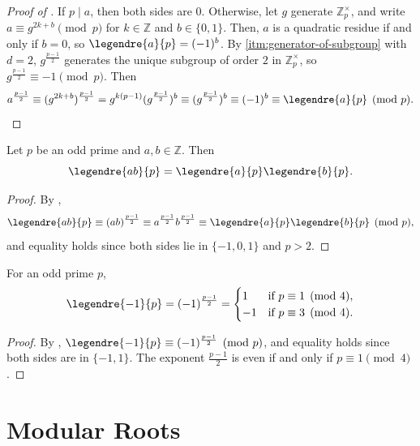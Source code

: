 \begin{proof}[Proof of ]
    If \(p \mid a\), then both sides are \(0\).
    Otherwise, let \(g\) generate \(\mathbb{Z}_p^\times\), and write \(a \equiv g^{2k + b} \pmod{p}\) for \(k \in \mathbb{Z}\) and \(b \in \{0, 1\}\).
    Then, \(a\) is a quadratic residue if and only if \(b = 0\), so \(\legendre{a}{p} = (-1)^b\).
    By \ref{itm:generator-of-subgroup} with \(d = 2\), \(g^{\frac{p-1}{2}}\) generates the unique subgroup of order \(2\) in \(\mathbb{Z}_p^\times\), so \(g^{\frac{p-1}{2}} \equiv -1 \pmod{p}\).
    Then
    \[
        a^{\frac{p-1}{2}} \equiv (g^{2k + b})^{\frac{p-1}{2}} = g^{k(p-1)} (g^{\frac{p-1}{2}})^b \equiv (g^{\frac{p-1}{2}})^b \equiv (-1)^b \equiv \legendre{a}{p} \pmod{p}. \qedhere
    \]
\end{proof}

\begin{corollary}
    Let \(p\) be an odd prime and \(a, b \in \mathbb{Z}\). Then
    \[
        \legendre{ab}{p} = \legendre{a}{p} \legendre{b}{p}.
    \]
\end{corollary}

\begin{proof}
    By ,
    \[
        \legendre{ab}{p} \equiv (ab)^{\frac{p-1}{2}} \equiv a^{\frac{p-1}{2}} b^{\frac{p-1}{2}} \equiv \legendre{a}{p} \legendre{b}{p} \pmod{p},
    \]
    and equality holds since both sides lie in \(\{-1, 0, 1\}\) and \(p > 2\).
\end{proof}

\begin{proposition}
    For an odd prime \(p\),
    \[
        \legendre{-1}{p} = (-1)^{\frac{p-1}{2}} =
        \begin{cases}
            1 & \text{if } p \equiv 1 \pmod{4}, \\
            -1 & \text{if } p \equiv 3 \pmod{4}.
        \end{cases}
    \]
\end{proposition}

\begin{proof}
    By , \(\legendre{-1}{p} \equiv (-1)^{\frac{p-1}{2}} \pmod{p}\), and equality holds since both sides are in \(\{-1, 1\}\).
    The exponent \(\frac{p-1}{2}\) is even if and only if \(p \equiv 1 \pmod{4}\).
\end{proof}

\section*{Modular Roots}

